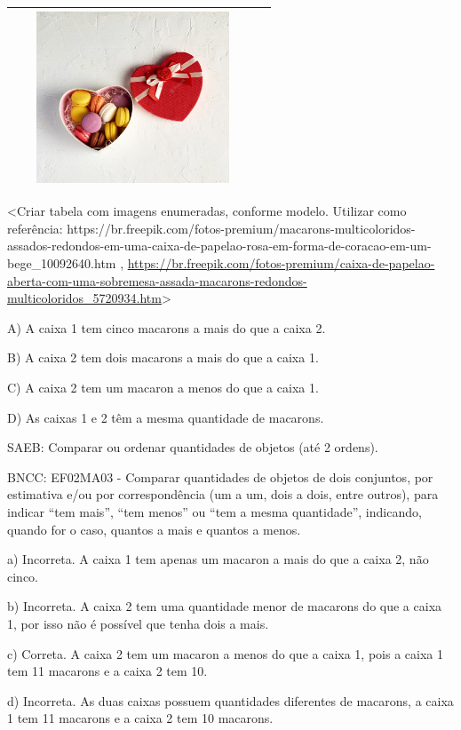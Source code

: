 \begin{escolha}
\begin{escolha}
{{{{\begin{longtable}[]{@{}ll@{}}
\begin{minipage}[t]{0.48\columnwidth}
\includegraphics[width=2.80101in,height=2.01728in]{media/image164.png}\strut
\end{minipage}\tabularnewline
\bottomrule
\end{longtable}

\textless{}Criar tabela com imagens enumeradas, conforme modelo.
Utilizar como referência:
https://br.freepik.com/fotos-premium/macarons-multicoloridos-assados-redondos-em-uma-caixa-de-papelao-rosa-em-forma-de-coracao-em-um-bege\_10092640.htm
,
\url{https://br.freepik.com/fotos-premium/caixa-de-papelao-aberta-com-uma-sobremesa-assada-macarons-redondos-multicoloridos_5720934.htm}\textgreater{}

A) A caixa 1 tem cinco macarons a mais do que a caixa 2.

B) A caixa 2 tem dois macarons a mais do que a caixa 1.

C) A caixa 2 tem um macaron a menos do que a caixa 1.

D) As caixas 1 e 2 têm a mesma quantidade de macarons.

SAEB: Comparar ou ordenar quantidades de objetos (até 2 ordens).

BNCC: EF02MA03 - Comparar quantidades de objetos de dois conjuntos, por
estimativa e/ou por correspondência (um a um, dois a dois, entre
outros), para indicar ``tem mais'', ``tem menos'' ou ``tem a mesma
quantidade'', indicando, quando for o caso, quantos a mais e quantos a
menos.

a) Incorreta. A caixa 1 tem apenas um macaron a mais do que a caixa 2, não cinco.

b) Incorreta. A caixa 2 tem uma quantidade menor de macarons do que a
caixa 1, por isso não é possível que tenha dois a mais.

c) Correta. A caixa 2 tem um macaron a menos do que a caixa 1, pois a
caixa 1 tem 11 macarons e a caixa 2 tem 10.

d) Incorreta. As duas caixas possuem quantidades diferentes de macarons,
a caixa 1 tem 11 macarons e a caixa 2 tem 10 macarons.

}}}}
\end{escolha}
\end{escolha}

